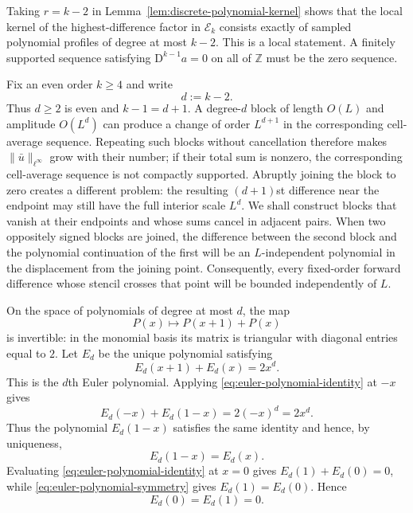 \documentclass[11pt]{amsart}
\theoremstyle{plain}
\theoremstyle{definition}
\theoremstyle{remark}
\numberwithin{equation}{section}
\theoremstyle{plain}
\begin{document}
Taking $r=k-2$ in Lemma~\ref{lem:discrete-polynomial-kernel} shows that the
local kernel of the highest-difference factor in $\mathcal E_k$ consists
exactly of sampled polynomial profiles of degree at most $k-2$.  This is a
local statement.  A finitely supported sequence satisfying
$\mathrm D^{k-1}a=0$ on all of $\mathbb Z$ must be the zero sequence.

Fix an even order $k\ge4$ and write
\begin{equation}\label{eq:even-order-parameter}
	d:=k-2.
\end{equation}
Thus $d\ge2$ is even and $k-1=d+1$.  A degree-$d$ block of length
$O(L)$ and amplitude $O(L^d)$
can produce a change of order $L^{d+1}$ in the corresponding
cell-average sequence.
Repeating such blocks without cancellation therefore makes
$\|\bar u\|_{\ell^\infty}$ grow with their number; if their total sum is
nonzero, the corresponding cell-average sequence is not compactly
supported.  Abruptly joining the block to zero creates a different problem:
the resulting $(d+1)$st difference near the endpoint may still have the full
interior scale $L^d$.  We shall construct blocks that vanish at their
endpoints and whose sums cancel in adjacent pairs.  When two oppositely signed
blocks are joined, the difference between the second block and the polynomial
continuation of the first will be an $L$-independent polynomial in the
displacement from the joining point.  Consequently, every fixed-order forward
difference whose stencil crosses that point will be bounded independently of
$L$.

On the space of polynomials of degree at most $d$, the map
\[
P(x)\longmapsto P(x+1)+P(x)
\]
is invertible: in the monomial basis its matrix is triangular with diagonal
entries equal to $2$.  Let $E_d$ be the unique polynomial satisfying
\begin{equation}\label{eq:euler-polynomial-identity}
	E_d(x+1)+E_d(x)=2x^d.
\end{equation}
This is the $d$th Euler polynomial.  Applying
\eqref{eq:euler-polynomial-identity} at $-x$ gives
\[
E_d(-x)+E_d(1-x)=2(-x)^d=2x^d.
\]
Thus the polynomial $E_d(1-x)$ satisfies the same identity and hence, by
uniqueness,
\begin{equation}\label{eq:euler-polynomial-symmetry}
	E_d(1-x)=E_d(x).
\end{equation}
Evaluating \eqref{eq:euler-polynomial-identity} at $x=0$ gives
$E_d(1)+E_d(0)=0$, while
\eqref{eq:euler-polynomial-symmetry} gives $E_d(1)=E_d(0)$.  Hence
\begin{equation}\label{eq:euler-polynomial-endpoints}
	E_d(0)=E_d(1)=0.
\end{equation}
\end{document}
